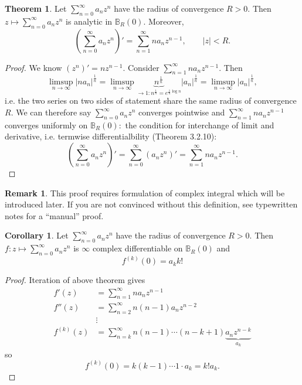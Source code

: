 \documentclass[a4paper]{article}
\theoremstyle{definition}
\newtheorem{thm}[defn]{Theorem}
\newtheorem{coro}[defn]{Corollary}
\newtheorem*{remark}{Remark}
\begin{document}
\begin{thm}
Let $\displaystyle \sum_{n=0}^\infty a_n z^n$ have the radius of convergence $R>0$. Then $\displaystyle z\mapsto \sum_{n=0}^\infty a_n z^n$ is analytic in $\mathbb B_R(0).$ Moreover,
\[
\left(\sum_{n=0}^\infty a_n z^n\right)' = \sum_{n=1}^\infty n a_n z^{n-1},\qquad |z|<R .
\]
\end{thm}
\begin{proof}
We know $(z^n)' = n z^{n-1}$. Consider $\displaystyle \sum_{n=1}^\infty n a_n z^{n-1}.$ Then
\[
\limsup_{n\rightarrow \infty} \left| n a_n \right|^{\frac1n} = \limsup_{n\rightarrow \infty} \underbrace{n^{\frac1n}}_{\rightarrow 1: n^{\frac1n} = e^{\frac1n \log n}} |a_n|^{\frac1n} = \limsup_{n\rightarrow \infty} |a_n|^{\frac1n},
\]
i.e. the two series on two sides of statement share the same radius of convergence $R$. We can therefore say $\displaystyle \sum_{n=0}^\infty a_n z^n$ converges pointwise and $\displaystyle \sum_{n=1}^\infty n a_n z^{n-1}$ converges uniformly on $\mathbb B_R(0):$ the condition for interchange of limit and derivative, i.e. termwise differentialbility (Theorem 3.2.10):
\[
\left(\sum_{n=0}^\infty a_n z^n\right)' = \sum_{n=0}^\infty \left(a_n z^n\right)' = \sum_{n=1}^\infty n a_n z^{n-1}.
\]
\end{proof}
\begin{remark}
This proof requires formulation of complex integral which will be introduced later. If you are not convinced without this definition, see typewritten notes for a ``manual'' proof.
\end{remark}
\begin{coro}
Let $\displaystyle \sum_{n=0}^\infty a_n z^n$ have the radius of convergence $R>0$. Then $f:z\mapsto \displaystyle \sum_{n=0}^\infty a_n z^n$ is $\infty$ complex differentiable on $\mathbb B_R(0)$ and
\[
f^{(k)}(0) = a_k k!
\]
\end{coro}
\begin{proof}
Iteration of above theorem gives
\[
\begin{aligned}
f'(z) &= \sum_{n=1}^\infty n a_n z^{n-1} \\
f''(z) &= \sum_{n=2}^\infty n(n-1) a_n z^{n-2} \\
&\vdots \\
f^{(k)}(z) &= \sum_{n=k}^\infty n(n-1)\cdots (n-k+1) \underbrace{a_n z^{n-k}}_{a_k}
\end{aligned}
\]
so
\[
f^{(k)}(0) = k(k-1)\cdots 1 \cdot a_k = k! a_k.
\]
\end{proof}
\end{document}
